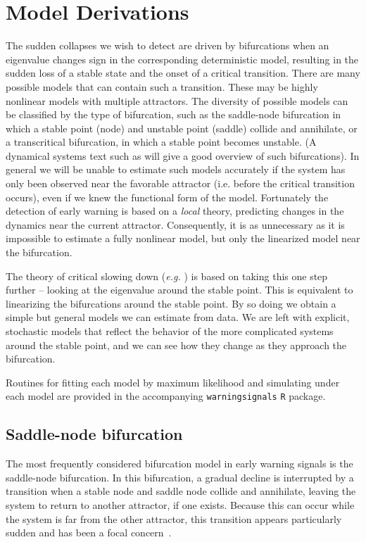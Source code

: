 \documentclass[authoryear, preprint,review,12pt]{elsarticle}
\begin{document}
\section{Model Derivations}\label{modelderivations}
The sudden collapses we wish to detect are driven by bifurcations when an eigenvalue changes sign in the corresponding deterministic model,
resulting in the sudden loss of a stable state and the onset of a critical transition.
There are many possible models that can contain such a transition.
These may be highly nonlinear models with multiple attractors.
The diversity of possible models can be classified by the type of bifurcation,
such as the saddle-node bifurcation in which a stable point (node) and unstable point (saddle) collide and annihilate,
or a transcritical bifurcation, in which a stable point becomes unstable.  
(A dynamical systems text such as \citet{Guckenheimer1983} will give a good overview of such bifurcations). 
In general we will be unable to estimate such models accurately if the system has only been observed near the favorable attractor
(i.e. before the critical transition occurs),
even if we knew the functional form of the model.
Fortunately the detection of early warning is based on a \emph{local} theory,
predicting changes in the dynamics near the current attractor.
Consequently, it is as unnecessary as it is impossible to estimate a fully nonlinear model,
but only the linearized model near the bifurcation.

The theory of critical slowing down (\emph{e.g.} \citet{Scheffer2009}) is based on taking this one step further -- 
looking at the eigenvalue around the stable point.
This is equivalent to linearizing the bifurcations around the stable point.
By so doing we obtain a simple but general models we can estimate from data.
We are left with explicit, stochastic models that reflect the behavior of the more complicated systems around the stable point,
and we can see how they change as they approach the bifurcation.  

Routines for fitting each model by maximum likelihood and simulating under each model are provided in the accompanying \texttt{warningsignals} \texttt{R} package.   

\subsection{Saddle-node bifurcation}
The most frequently considered bifurcation model in early warning signals is the saddle-node bifurcation.  
In this bifurcation, a gradual decline is interrupted by a transition when a stable node and saddle node collide and annihilate, 
leaving the system to return to another attractor, if one exists.  
Because this can occur while the system is far from the other attractor, 
this transition appears particularly sudden and has been a focal concern~\citep{Scheffer2001, Scheffer2009}.  
\end{document}
